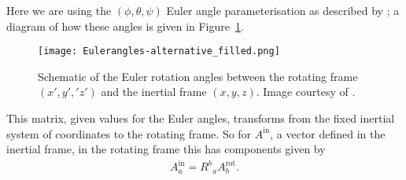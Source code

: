 \documentclass[../full_thesis/full_thesis.tex]{subfiles}
\begin{document}
Here we are using the
$(\phi, \theta, \psi)$ Euler
angle parameterisation as described by \citet{Landau1969}; a diagram of how
these angles is given in Figure~\ref{fig: Euler}.\begin{figure}[ht]
\centering
\texttt{[image: Eulerangles-alternative\_filled.png]}
\caption{Schematic of the Euler rotation angles between the rotating
frame $(x', y', 'z')$ and the inertial frame $(x, y, z)$. Image courtesy of
 \citet{WikipediaEuler}.}
\label{fig: Euler}
\end{figure}
This matrix, given values for the Euler angles, transforms from the fixed
inertial system of coordinates to the rotating frame. So for $A^{\textrm{in}}$,
a vector defined in the inertial frame, in the rotating frame this has
components given by
\begin{align}
A^{\textrm{in}}_{a} = R^{b}_{\;\;a} A^{\textrm{rot}}_{b}.
\end{align}
\end{document}
